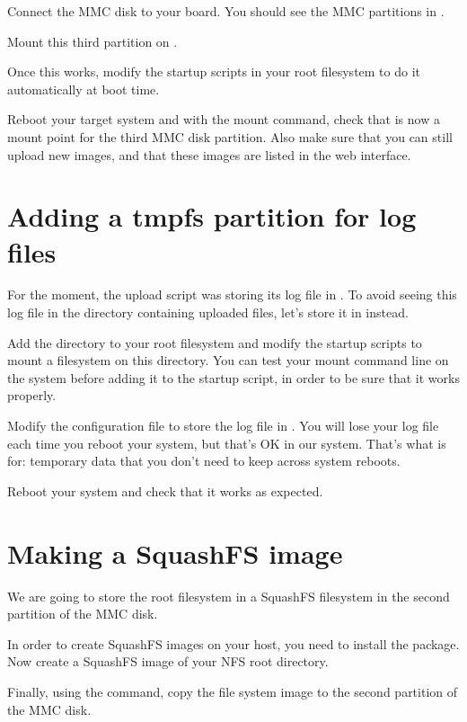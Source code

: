 Connect the MMC disk to your board. You should see the MMC partitions
in .

Mount this third partition on .

Once this works, modify the startup scripts in your root filesystem
to do it automatically at boot time.

Reboot your target system and with the mount command, check that
 is now a mount point for the third MMC disk
partition. Also make sure that you can still upload new images, and
that these images are listed in the web interface.

\section{Adding a tmpfs partition for log files}

For the moment, the upload script was storing its log file in
. To avoid seeing this log file in
the directory containing uploaded files, let's store it in
 instead.

Add the  directory to your root filesystem and modify
the startup scripts to mount a  filesystem on this
directory. You can test your  mount command line on the
system before adding it to the startup script, in order to be sure
that it works properly.

Modify the  configuration file to store
the log file in . You will lose your log
file each time you reboot your system, but that's OK in our
system. That's what  is for: temporary data that you don't need
to keep across system reboots.

Reboot your system and check that it works as expected.

\section{Making a SquashFS image}

We are going to store the root filesystem in a SquashFS filesystem in
the second partition of the MMC disk.

In order to create SquashFS images on your host, you need to install
the  package. Now create a SquashFS image of your
NFS root directory.

Finally, using the  command, copy the file system image to
the second partition of the MMC disk.

